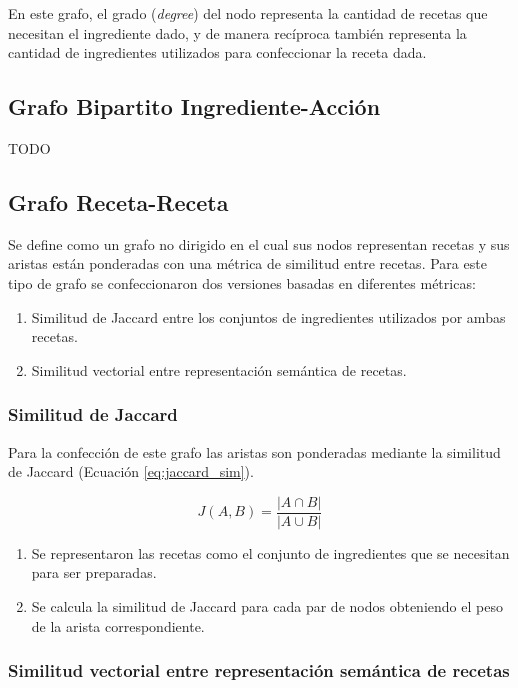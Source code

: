 \documentclass[
	a4paper, %
	10pt, %
	unnumberedsections, %
	twoside, %
]{LTJournalArticle}
\begin{document}
En este grafo, el grado (\textit{degree}) del nodo representa la cantidad de recetas que necesitan
el ingrediente dado, y de manera recíproca también representa la cantidad de ingredientes utilizados para 
confeccionar la receta dada.

\subsection{Grafo Bipartito Ingrediente-Acción}

TODO

\subsection{Grafo Receta-Receta}

Se define como un grafo no dirigido en el cual sus nodos representan recetas y sus aristas
están ponderadas con una métrica de similitud entre recetas. Para este tipo de grafo se confeccionaron dos 
versiones basadas en diferentes métricas:

\begin{enumerate}
	\item Similitud de Jaccard entre los conjuntos de ingredientes utilizados por ambas recetas.
	\item Similitud vectorial entre representación semántica de recetas.
\end{enumerate}

\subsubsection{Similitud de Jaccard}

Para la confección de este grafo las aristas son ponderadas mediante la similitud de Jaccard (Ecuación \ref{eq:jaccard_sim}).

\begin{equation}
	J(A, B) = \frac{|A \cap B|}{|A \cup B|}
	\label{eq:jaccard_sim}
\end{equation}

\begin{enumerate}
	\item Se representaron las recetas como el conjunto de ingredientes que se necesitan para ser preparadas.
	\item Se calcula la similitud de Jaccard para cada par de nodos obteniendo el peso de la arista correspondiente.
\end{enumerate}

\subsubsection{Similitud vectorial entre representación semántica de recetas}
\end{document}
